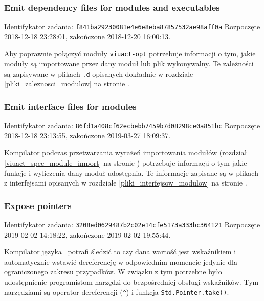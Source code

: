 \subsubsection{Emit dependency files for modules and executables}

Identifykator zadania: \texttt{f841ba29230081e4e6e8eba87857532ae98aff0a}
\newline
Rozpoczęte 2018-12-18 23:28:01, zakończone 2018-12-20 16:00:13.
\newline

Aby poprawnie połączyć moduły \texttt{viuact-opt} potrzebuje informacji o tym,
jakie moduły są importowane przez dany moduł lub plik wykonywalny. Te zależności
są zapisywane w plikach \texttt{.d} opisanych dokładnie w rozdziale
\ref{pliki_zaleznosci_modulow} na stronie \pageref{pliki_zaleznosci_modulow}.

\subsubsection{Emit interface files for modules}
\label{issue_86fd1a408cf62ecbebb7459b7d08298ce0a851bc}

Identifykator zadania: \texttt{86fd1a408cf62ecbebb7459b7d08298ce0a851bc}
\newline
Rozpoczęte 2018-12-18 23:13:55, zakończone 2019-03-27 18:09:37.
\newline

Kompilator podczas przetwarzania wyrażeń importowania modułów (rozdział
\ref{viuact_spec_module_import} na stronie \pageref{viuact_spec_module_import})
potrzebuje informacji o tym jakie funkcje i wyliczenia dany moduł udostępnia. Te
informacje zapisane są w plikach z interfejsami opisanych w rozdziale
\ref{pliki_interfejsow_modulow} na stronie \pageref{pliki_interfejsow_modulow}.

\subsubsection{Expose pointers}

Identifykator zadania: \texttt{3208ed0629487b2c02e14cfe5173a333bc364121}
\newline
Rozpoczęte 2019-02-02 14:18:22, zakończone 2019-02-02 19:55:44.
\newline

Kompilator języka \ViuAct\ potrafi śledzić to czy dana wartość jest wskaźnikiem
i automatycznie wstawić dereferencję w odpowiednim momencie jedynie dla
ograniczonego zakresu przypadków. W związku z tym potrzebne było udostępnienie
programistom narzędzi do bezpośredniej obsługi wskaźników. Tym narzędziami są
operator dereferencji (\texttt{\^}) i funkcja \texttt{Std.Pointer.take()}.

